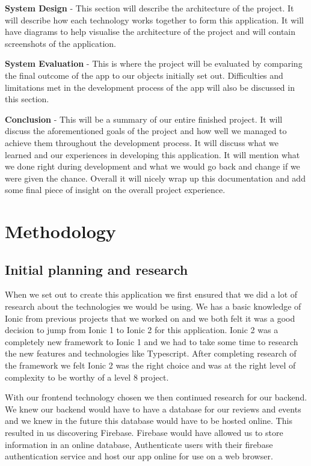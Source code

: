 \textbf {System Design} - This section will describe the architecture of the project. It will describe how each technology works together to form this application. It will have diagrams to help visualise the architecture of the project and will contain screenshots of the application.

\textbf {System Evaluation} - This is where the project will be evaluated by comparing the final outcome of the app to our objects initially set out. Difficulties and limitations met in the development process of the app will also be discussed in this section.

\textbf {Conclusion} - This will be a summary of our entire finished project. It will discuss the aforementioned goals of the project and how well we managed to achieve them throughout the development process. It will discuss what we learned and our experiences in developing this application. It will mention what we done right during development and what we would go back and change if we were given the chance. Overall it will nicely wrap up this documentation and add some final piece of insight on the overall project experience.

\chapter{Methodology}
\section{Initial planning and research}
When we set out to create this application we first ensured that we did a lot of research about the technologies we would be using. We has a basic knowledge of Ionic from previous projects that we worked on and we both felt it was a good decision to jump from Ionic 1 to Ionic 2 for this application. Ionic 2 was a completely new framework to Ionic 1 and we had to take some time to research the new features and technologies like Typescript. After completing research of the framework we felt Ionic 2 was the right choice and was at the right level of complexity to be worthy of a level 8 project.

With our frontend technology chosen we then continued research for our backend. We knew our backend would have to have a database for our reviews and events and we knew in the future this database would have to be hosted online. This resulted in us discovering Firebase. Firebase would have allowed us to store information in an online database, Authenticate users with their firebase authentication service and host our app online for use on a web browser.

